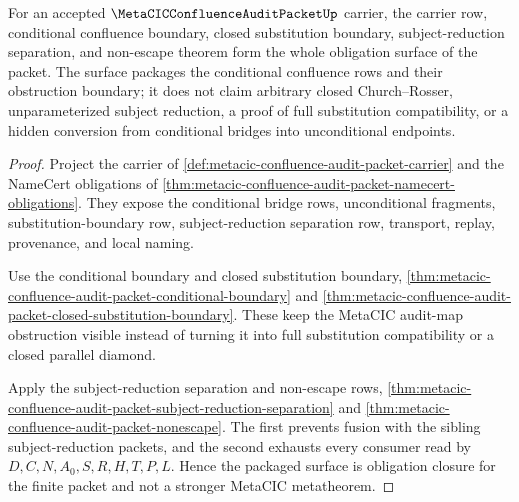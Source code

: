 \begin{theorem}
\label{thm:metacic-confluence-audit-packet-obligation-closure-package}
For an accepted $\MetaCICConfluenceAuditPacketUp$ carrier, the carrier row, conditional confluence boundary, closed substitution boundary, subject-reduction separation, and non-escape theorem form the whole obligation surface of the packet. The surface packages the conditional confluence rows and their obstruction boundary; it does not claim arbitrary closed Church--Rosser, unparameterized subject reduction, a proof of full substitution compatibility, or a hidden conversion from conditional bridges into unconditional endpoints.
\end{theorem}
\begin{proof}
Project the carrier of \autoref{def:metacic-confluence-audit-packet-carrier} and the NameCert obligations of \autoref{thm:metacic-confluence-audit-packet-namecert-obligations}. They expose the conditional bridge rows, unconditional fragments, substitution-boundary row, subject-reduction separation row, transport, replay, provenance, and local naming.

Use the conditional boundary and closed substitution boundary, \autoref{thm:metacic-confluence-audit-packet-conditional-boundary} and \autoref{thm:metacic-confluence-audit-packet-closed-substitution-boundary}. These keep the MetaCIC audit-map obstruction visible instead of turning it into full substitution compatibility or a closed parallel diamond.

Apply the subject-reduction separation and non-escape rows, \autoref{thm:metacic-confluence-audit-packet-subject-reduction-separation} and \autoref{thm:metacic-confluence-audit-packet-nonescape}. The first prevents fusion with the sibling subject-reduction packets, and the second exhausts every consumer read by $D,C,N,A_0,S,R,H,T,P,L$. Hence the packaged surface is obligation closure for the finite packet and not a stronger MetaCIC metatheorem.
\end{proof}

